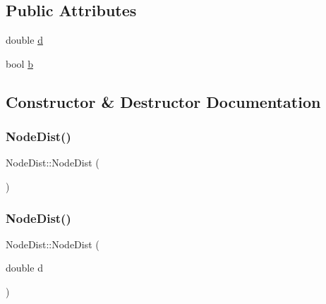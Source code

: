 \subsection*{Public Attributes}
\begin{DoxyCompactItemize}
\item 
double \hyperlink{class_node_dist_a5fb5b79a3402236741cb30dc4197d01d}{d}
\item 
bool \hyperlink{class_node_dist_a47cf7839304cb579bf424c740105b504}{b}
\end{DoxyCompactItemize}


\subsection{Constructor \& Destructor Documentation}
\mbox{\label{class_node_dist_a8a756d7e58f75575ddc390228b01de6d}} 
\subsubsection{\texorpdfstring{Node\+Dist()}{NodeDist()}\hspace{0.1cm}{\footnotesize\ttfamily [1/3]}}
{\footnotesize\ttfamily Node\+Dist\+::\+Node\+Dist (\begin{DoxyParamCaption}{ }\end{DoxyParamCaption})\hspace{0.3cm}{\ttfamily [inline]}}

\mbox{\label{class_node_dist_aa5fb8c1b973ebc583d68b9f9b2aa79a1}} 
\subsubsection{\texorpdfstring{Node\+Dist()}{NodeDist()}\hspace{0.1cm}{\footnotesize\ttfamily [2/3]}}
{\footnotesize\ttfamily Node\+Dist\+::\+Node\+Dist (\begin{DoxyParamCaption}\item[{double}]{d }\end{DoxyParamCaption})\hspace{0.3cm}{\ttfamily [inline]}}

\mbox{\label{class_node_dist_a637baaba0175576b8978ad3196e9e152}} 
